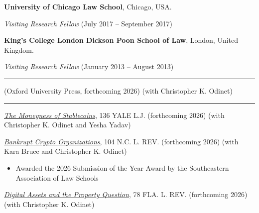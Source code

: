 \documentclass[
  11pt,
  letterpaper]{article}
\begin{document}
\vspace{0.8em}\noindent\textbf{University of Chicago Law School},
Chicago, USA.

\bgroup \par\leftskip=0.5in\parskip=0pt\parindent=0pt
\textit{Visiting Research Fellow} (July 2017 -- September 2017)
\par\leftskip=0pt\egroup

\vspace{0.8em}\noindent\textbf{King's College London Dickson Poon School of Law},
London, United Kingdom.

\bgroup \par\leftskip=0.5in\parskip=0pt\parindent=0pt
\textit{Visiting Research Fellow} (January 2013 -- August 2013)
\par\leftskip=0pt\egroup

\vspace{0.25em}\hrule\vspace{0.7em}

(Oxford University Press, forthcoming 2026) (with Christopher K. Odinet)

\vspace{0.25em}\hrule\vspace{0.7em}

\noindent\href{https://www.andreatosato.com/articles/moneyness-of-stablecoins}{\textit{The Moneyness of Stablecoins}},
136 {\fontsize{9.5}{11}\selectfont\MakeUppercase{Yale L.J.}}
(forthcoming 2026) (with Christopher K. Odinet and Yesha Yadav)

\vspace{0.5em}\noindent\href{https://www.andreatosato.com/articles/bankrupt-crypto-organizations}{\textit{Bankrupt Crypto Organizations}},
104 {\fontsize{9.5}{11}\selectfont\MakeUppercase{N.C. L. Rev.}}
(forthcoming 2026) (with Kara Bruce and Christopher K. Odinet)

\begin{itemize}
\item Awarded the 2026 Submission of the Year Award by the Southeastern Association of Law Schools
\end{itemize}

\vspace{0.5em}\noindent\href{https://www.andreatosato.com/articles/digital-assets-property-question}{\textit{Digital Assets and the Property Question}},
78 {\fontsize{9.5}{11}\selectfont\MakeUppercase{Fla. L. Rev.}}
(forthcoming 2026) (with Christopher K. Odinet)
\end{document}
